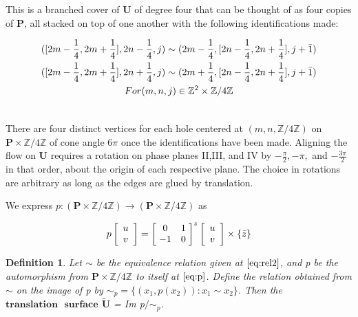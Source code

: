 \documentclass[]{article}
\newtheorem{Def}{Definition}[subsection]
\begin{document}
\begin{center}

\end{center}
This is a branched cover of $\mathbf{U}$ of degree four that can be thought of as four copies of $\mathbf{P}$, all stacked on top of one another with the following identifications made:


\begin{multline}
([2m-\frac{1}{4}, 2m+\frac{1}{4}], 2n-\frac{1}{4},j)\sim(2m-\frac{1}{4},[2n-\frac{1}{4}, 2n+\frac{1}{4}],j+\bar{1})\\
([2m-\frac{1}{4}, 2m+\frac{1}{4}], 2n+\frac{1}{4},j)\sim(2m+\frac{1}{4},[2n-\frac{1}{4}, 2n+\frac{1}{4}],j+\bar{1})\\
\vspace{0.2in}For (m,n,j) \in \mathbb{Z}^{2}\times\mathbb{Z}/4\mathbb{Z}
\label{eq:rel2}
\end{multline}

There are four distinct vertices for each hole centered at $(m,n,\mathbb{Z}/4\mathbb{Z})$ on  $\mathbf{P}\times\mathbb{Z}/4\mathbb{Z}$ of cone angle $6\pi$ once the identifications have been made. Aligning the flow on  $\mathbf{U}$ requires a rotation on phase planes II,III, and IV by $-\frac{\pi}{2}, -\pi,$ and $ -\frac{3\pi}{2}$ in that order, about the origin of each respective plane. The choice in rotations are arbitrary as long as the edges are glued by translation. 


We express  $p:(\mathbf{P}\times\mathbb{Z}/4\mathbb{Z}) \rightarrow (\mathbf{P}\times\mathbb{Z}/4\mathbb{Z})$ as

\begin{equation}
	p\left[\begin{array}{c}
		u\\v
	\end{array}\right] =
		\left[ \hspace{1mm} \begin{matrix}
				0 & 1\\
				-1 & 0
			\end{matrix}\hspace{1mm}\right]^{z}\left[\begin{array}{c}
					u\\v
				\end{array}\right]\times\{\bar z\}
\label{eq:p}
\end{equation}

\begin{Def} Let $\sim$ be the equivalence relation given at $\eqref{eq:rel2}$, and p be the automorphism from $\mathbf{P}\times\mathbb{Z}/4\mathbb{Z}$ to itself at $\eqref{eq:p}$. Define the relation obtained from $\sim$ on the image of p by $\sim_{p} = \{(x_1,p(x_2)) : x_1 \sim x_2\}$. Then the $\mathbf{translation\text{ }surface}$  $\tilde{\mathbf{U}}$ = Im p$\slash\sim_{p}$. 
\end{Def}
\end{document}
